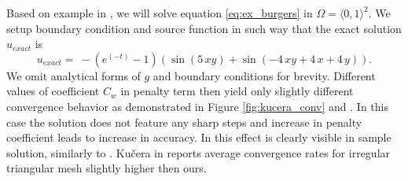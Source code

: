 \begin{example}
\label{ex:kucera}
Based on example in \cite[Section 1.6]{Kucera},
we will solve equation \eqref{eq:ex_burgers} in $\Omega = \langle 0, 1 \rangle^2$.
We setup boundary condition and source function in such way that the exact 
solution $u_{exact}$ is
\begin{equation}
	u_{exact} =  \ -{\left(e^{\left(-t\right)} - 1\right)} {\left(\sin\left(5 \,x 
	y\right) + \sin\left(-4 \, 
	x y + 4 \,x + 4 \, y\right)\right)}.
\end{equation}
We omit analytical forms of $g$ and boundary conditions for brevity.
Different values of coefficient $C_w$ in penalty term then yield only slightly different 
convergence behavior as demonstrated in Figure \ref{fig:kucera_conv} and 
. In this case the solution does not feature any sharp steps and 
increase in penalty coefficient leads to increase in accuracy. In  
this effect is clearly visible in sample solution, similarly to . Kučera 
in \cite{Kucera} reports average convergence rates for irregular triangular mesh 
slightly higher then ours.

\end{example}
